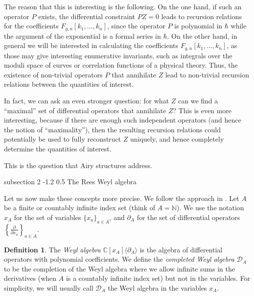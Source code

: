 \documentclass[reqno,oneside,11pt]{amsart}
\makeatletter
\theoremstyle{plain}
\theoremstyle{definition}
\newtheorem{definition}[theorem]{Definition}
\theoremstyle{remark}
\numberwithin{equation}{section}
\renewcommand{\subsection}{\@startsection
{subsection}%
{2}%
{\z@}%
{-1.2\baselineskip}%
{0.5\baselineskip}%
{\normalfont \bf \normalsize}} %
\makeatother
\begin{document}
The reason that this is interesting is the following. On the one hand, if such an operator $P$ exists, the differential constraint $P Z = 0$ leads to recursion relations for the coefficients $F_{g,n}[k_1,\ldots,k_n]$, since the operator $P$ is polynomial in $\hbar$ while the argument of the exponential is a formal series in $\hbar$. On the other hand, in general we will be interested in calculating the coefficients $F_{g,n}[k_1,\ldots,k_n]$, as those may give interesting enumerative invariants, such as integrals over the moduli space of curves or correlation functions of a physical theory. Thus, the existence of non-trivial operators $P$ that annihilate $Z$ lead to non-trivial recursion relations between the quantities of interest.

In fact, we can ask an even stronger question: for what $Z$ can we find a ``maximal'' set of differential operators that annihilate $Z$? This is even more interesting, because if there are enough such independent operators (and hence the notion of ``maximality''), then the resulting recursion relations could potentially be used to fully reconstruct $Z$ uniquely, and hence completely determine the quantities of interest.

This is the question that Airy structures address.


\subsection{The Rees Weyl algebra}

Let us now make these concepts more precise. We follow the approach in \cite{BCJ22}.  Let $A$ be a finite or countably infinite index set (think of $A = \mathbb{N}$). We use the notation $x_A$ for the set of variables $\{x_a \}_{a \in A}$, and $\partial_A$ for the set of differential operators $\left\{ \frac{\partial}{\partial x_a} \right \}_{a \in A}$. 

\begin{definition}\label{d:Weyl}
The \emph{Weyl algebra} $ \mathbb{C}[x_A]\langle \partial_A \rangle$ is the algebra of differential operators with polynomial coefficients. We define the \emph{completed Weyl algebra} $\mathcal{D}_A$ to be the completion of the Weyl algebra where we allow infinite sums in the derivatives (when $A$ is a countably infinite index set) but not in the variables. For simplicity, we will usually call $\mathcal{D}_A$ the Weyl algebra in the variables $x_A$.
\end{definition}
\end{document}

